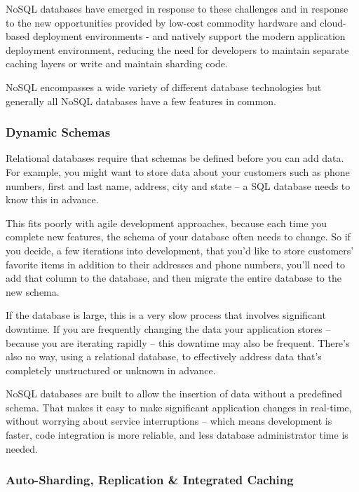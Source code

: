 \documentclass[12pt]{article}
\begin{document}
NoSQL databases have emerged in response to these challenges and in response to the new opportunities provided by low-cost commodity hardware and cloud-based deployment environments - and natively support the modern application deployment environment, reducing the need for developers to maintain separate caching layers or write and maintain sharding code.


NoSQL encompasses a wide variety of different database technologies but generally all NoSQL databases have a few features in common.

\subsubsection{Dynamic Schemas}

Relational databases require that schemas be defined before you can add data. For example, you might want to store data about your customers such as phone numbers, first and last name, address, city and state – a SQL database needs to know this in advance.

This fits poorly with agile development approaches, because each time you complete new features, the schema of your database often needs to change. So if you decide, a few iterations into development, that you'd like to store customers' favorite items in addition to their addresses and phone numbers, you'll need to add that column to the database, and then migrate the entire database to the new schema.

If the database is large, this is a very slow process that involves significant downtime. If you are frequently changing the data your application stores – because you are iterating rapidly – this downtime may also be frequent. There's also no way, using a relational database, to effectively address data that's completely unstructured or unknown in advance.

NoSQL databases are built to allow the insertion of data without a predefined schema. That makes it easy to make significant application changes in real-time, without worrying about service interruptions – which means development is faster, code integration is more reliable, and less database administrator time is needed.

\subsubsection{Auto-Sharding, Replication \& Integrated Caching}
\end{document}
